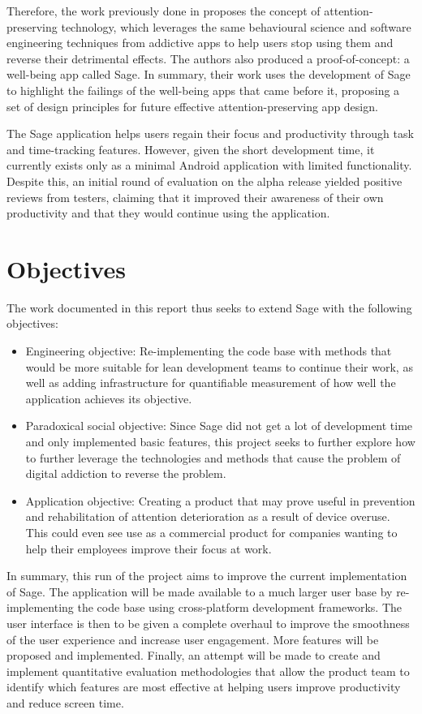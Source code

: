 Therefore, the work previously done in \cite{sagePaper2020} proposes the concept of attention-preserving technology, which leverages the same behavioural science and software engineering techniques from addictive apps to help users stop using them and reverse their detrimental effects. The authors also produced a proof-of-concept: a well-being app called Sage. In summary, their work uses the development of Sage to highlight the failings of the well-being apps that came before it, proposing a set of design principles for future effective attention-preserving app design.

The Sage application helps users regain their focus and productivity through task and time-tracking features. However, given the short development time, it currently exists only as a minimal Android application with limited functionality. Despite this, an initial round of evaluation on the alpha release yielded positive reviews from testers, claiming that it improved their awareness of their own productivity and that they would continue using the application.

\section{Objectives}
The work documented in this report thus seeks to extend Sage with the following objectives:

\begin{itemize}
    \item Engineering objective: Re-implementing the code base with methods that would be more suitable for lean development teams to continue their work, as well as adding infrastructure for quantifiable measurement of how well the application achieves its objective.
    \item Paradoxical social objective: Since Sage did not get a lot of development time and only implemented basic features, this project seeks to further explore how to further leverage the technologies and methods that cause the problem of digital addiction to reverse the problem.
    \item Application objective: Creating a product that may prove useful in prevention and rehabilitation of attention deterioration as a result of device overuse. This could even see use as a commercial product for companies wanting to help their employees improve their focus at work.
\end{itemize}

In summary, this run of the project aims to improve the current implementation of Sage. The application will be made available to a much larger user base by re-implementing the code base using cross-platform development frameworks. The user interface is then to be given a complete overhaul to improve the smoothness of the user experience and increase user engagement. More features will be proposed and implemented. Finally, an attempt will be made to create and implement quantitative evaluation methodologies that allow the product team to identify which features are most effective at helping users improve productivity and reduce screen time.